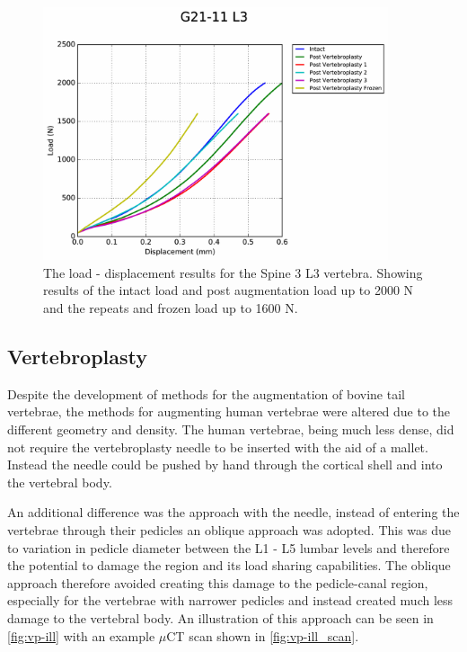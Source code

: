 \begin{figure}[ht!]
  \centering
  \includegraphics[width=4in]{Chapters/Chapter_HT_images/G21-11_L3.pdf}
  \caption{The load - displacement results for the Spine 3 L3 vertebra. Showing
    results of the intact load and post augmentation load up to 2000 N and the
    repeats and frozen load up to 1600 N.}
  \label{fig:Spine3_L3}
\end{figure}






\subsection{Vertebroplasty}

Despite the development of methods for the augmentation of bovine tail
vertebrae, the methods for augmenting human vertebrae were altered due to the
different geometry and density. The human vertebrae, being much less dense, did
not require the vertebroplasty needle to be inserted with the aid of a mallet.
Instead the needle could be pushed by hand through the cortical shell and into
the vertebral body.

An additional difference was the approach with the needle, instead of entering
the vertebrae through their pedicles an oblique approach was adopted. This was
due to variation in pedicle diameter between the L1 - L5 lumbar levels and
therefore the potential to damage the region and its load sharing capabilities.
The oblique approach therefore avoided creating this damage to the pedicle-canal
region, especially for the vertebrae with narrower pedicles and instead created
much less damage to the vertebral body.
An illustration of this approach can be seen in \cref{fig:vp-ill} with an example $\mu$CT scan shown in \cref{fig:vp-ill_scan}.



